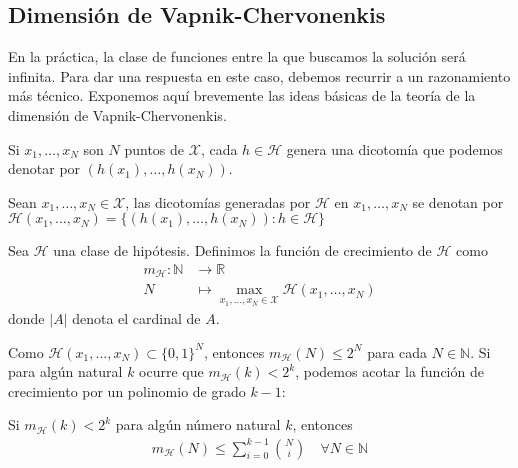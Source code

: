 \subsection{Dimensión de Vapnik-Chervonenkis}
En la práctica, la clase de funciones entre la que buscamos la solución será infinita. Para dar una respuesta en este caso, debemos recurrir a un razonamiento más técnico. Exponemos aquí brevemente las ideas básicas de la teoría de la dimensión de Vapnik-Chervonenkis. 

Si $x_1, \ldots, x_N$ son $N$ puntos de $\mathcal{X}$, cada $h \in \mathcal{H}$ genera una dicotomía que podemos denotar por $(h(x_1), \ldots, h(x_N))$.
\begin{definition}
	Sean $x_1, \ldots, x_N \in \mathcal{X}$, las dicotomías generadas por $\mathcal{H}$ en $x_1, \ldots, x_N$ se denotan por $\mathcal{H}(x_1, \ldots, x_N) = \{ (h(x_1), \ldots, h(x_N)) \colon h \in \mathcal{H} \} $
\end{definition}

\begin{definition}
	Sea $\mathcal{H}$ una clase de hipótesis. Definimos la función de crecimiento de $\mathcal{H}$ como 
	\begin{align*}
		m_{\mathcal{H}} \colon \mathbb{N} &\to \mathbb{R}\\
		N &\mapsto \max_{x_1, \ldots, x_N \in \mathcal{X}}  \mathcal{H}(x_1, \ldots, x_N)
	\end{align*}
	donde $|A|$ denota el cardinal de $A$.
\end{definition}

Como  $\mathcal{H}(x_1, \ldots, x_N) \subset \{ 0, 1 \}^N$, entonces $m_{\mathcal{H}}(N) \leq 2^N$ para cada $N \in \mathbb{N}$. Si para algún natural $k$ ocurre que $m_{\mathcal{H}}(k) < 2^k$, podemos acotar la función de crecimiento por un polinomio de grado $k-1$:

\begin{prop}
	Si $m_{\mathcal{H}}(k) < 2^k$ para algún número natural $k$, entonces 
	\begin{align*}
		m_{\mathcal{H}}(N) \leq \sum_{i=0}^{k-1} \binom{N}{i} \quad \forall N \in \mathbb{N}
	\end{align*}
\end{prop}


